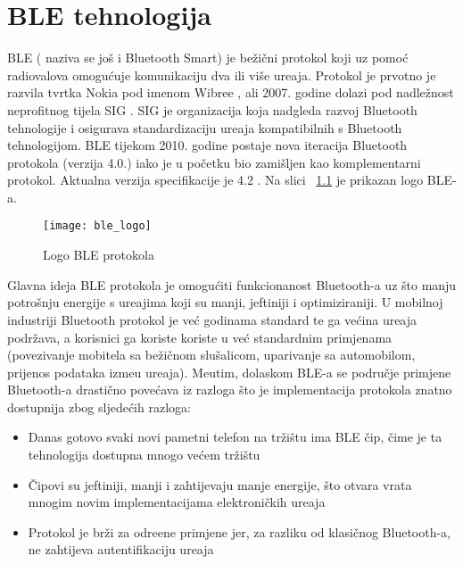 
\chapter{BLE tehnologija}
BLE ( naziva se jo\v{s} i Bluetooth Smart) je be\v{z}i\v{c}ni protokol koji uz pomo\'{c} radiovalova omogu\'{c}uje komunikaciju dva ili vi\v{s}e ure\dj aja. Protokol je prvotno je razvila tvrtka Nokia pod imenom Wibree \cite{wibree}, ali 2007. godine dolazi pod nadle\v{z}nost neprofitnog tijela SIG \cite{sig}. SIG je organizacija koja nadgleda razvoj Bluetooth tehnologije i osigurava standardizaciju ure\dj aja kompatibilnih s Bluetooth tehnologijom. BLE tijekom 2010. godine postaje nova iteracija Bluetooth protokola (verzija 4.0.) iako je u po\v{c}etku bio zami\v{s}ljen kao komplementarni protokol. Aktualna verzija specifikacije je 4.2 \cite{ble_specification}. Na slici ~\ref{fig:ble} je prikazan logo BLE-a.

\begin{figure}[!htbp]
	\begin{center}
 \texttt{[image: ble\_logo]}
 \caption{Logo BLE protokola}
 \label{fig:ble}
	\end{center}
\end{figure}

Glavna ideja BLE protokola je omogu\'{c}iti funkcionanost Bluetooth-a uz \v{s}to manju potro\v{s}nju energije s ure\dj ajima koji su manji, jeftiniji i optimiziraniji. U mobilnoj industriji Bluetooth protokol je ve\'{c} godinama standard te ga ve\'{c}ina ure\dj aja podr\v{z}ava, a korisnici ga koriste koriste u ve\'{c} standardnim primjenama (povezivanje mobitela sa be\v{z}i\v{c}nom slu\v{s}alicom, uparivanje sa automobilom, prijenos podataka izme\dj u ure\dj aja). Me\dj utim, dolaskom BLE-a se podru\v{c}je primjene Bluetooth-a drasti\v{c}no pove\'{c}ava iz razloga \v{s}to je implementacija protokola znatno dostupnija zbog sljede\'{c}ih razloga:

\begin{itemize}
	\item Danas gotovo svaki novi pametni telefon na tr\v{z}i\v{s}tu ima BLE \v{c}ip, \v{c}ime je ta tehnologija dostupna mnogo ve\'{c}em tr\v{z}i\v{s}tu
	\item \v{C}ipovi su jeftiniji, manji i zahtijevaju manje energije, \v{s}to otvara vrata mnogim novim implementacijama elektroni\v{c}kih ure\dj aja
	\item Protokol je br\v{z}i za odre\dj ene primjene jer, za razliku od klasi\v{c}nog Bluetooth-a, ne zahtijeva autentifikaciju ure\dj aja
\end{itemize}


